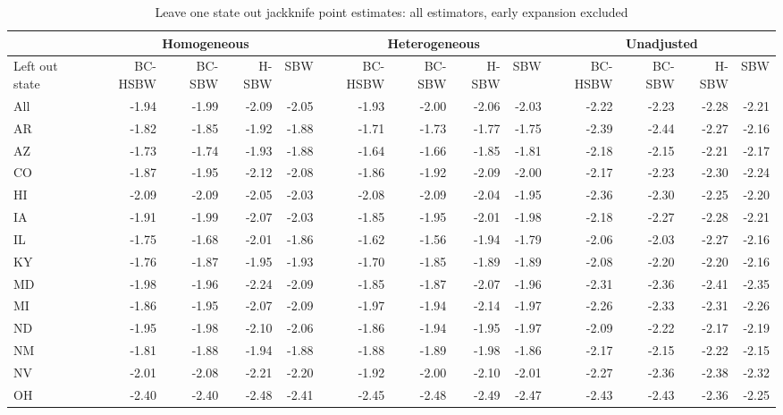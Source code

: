 \begin{landscape}
\begin{table}\caption{Leave one state out jackknife point estimates: all estimators, early expansion excluded}\label{tab:loojackknifec2}
\begin{tabular}{lrrrr|rrrr|rrrr}
\hline
 & \multicolumn{4}{c}{Homogeneous} & \multicolumn{4}{c}{Heterogeneous} & \multicolumn{4}{c}{Unadjusted} \\ 
 \hline
Left out state & BC-HSBW & BC-SBW & H-SBW & SBW & BC-HSBW & BC-SBW & H-SBW & SBW & BC-HSBW & BC-SBW & H-SBW & SBW \\ 
\hline
All & -1.94 & -1.99 & -2.09 & -2.05 & -1.93 & -2.00 & -2.06 & -2.03 & -2.22 & -2.23 & -2.28 & -2.21 \\ 
AR & -1.82 & -1.85 & -1.92 & -1.88 & -1.71 & -1.73 & -1.77 & -1.75 & -2.39 & -2.44 & -2.27 & -2.16 \\ 
AZ & -1.73 & -1.74 & -1.93 & -1.88 & -1.64 & -1.66 & -1.85 & -1.81 & -2.18 & -2.15 & -2.21 & -2.17 \\ 
CO & -1.87 & -1.95 & -2.12 & -2.08 & -1.86 & -1.92 & -2.09 & -2.00 & -2.17 & -2.23 & -2.30 & -2.24 \\ 
HI & -2.09 & -2.09 & -2.05 & -2.03 & -2.08 & -2.09 & -2.04 & -1.95 & -2.36 & -2.30 & -2.25 & -2.20 \\ 
IA & -1.91 & -1.99 & -2.07 & -2.03 & -1.85 & -1.95 & -2.01 & -1.98 & -2.18 & -2.27 & -2.28 & -2.21 \\ 
IL & -1.75 & -1.68 & -2.01 & -1.86 & -1.62 & -1.56 & -1.94 & -1.79 & -2.06 & -2.03 & -2.27 & -2.16 \\ 
KY & -1.76 & -1.87 & -1.95 & -1.93 & -1.70 & -1.85 & -1.89 & -1.89 & -2.08 & -2.20 & -2.20 & -2.16 \\ 
MD & -1.98 & -1.96 & -2.24 & -2.09 & -1.85 & -1.87 & -2.07 & -1.96 & -2.31 & -2.36 & -2.41 & -2.35 \\ 
MI & -1.86 & -1.95 & -2.07 & -2.09 & -1.97 & -1.94 & -2.14 & -1.97 & -2.26 & -2.33 & -2.31 & -2.26 \\ 
ND & -1.95 & -1.98 & -2.10 & -2.06 & -1.86 & -1.94 & -1.95 & -1.97 & -2.09 & -2.22 & -2.17 & -2.19 \\ 
NM & -1.81 & -1.88 & -1.94 & -1.88 & -1.88 & -1.89 & -1.98 & -1.86 & -2.17 & -2.15 & -2.22 & -2.15 \\ 
NV & -2.01 & -2.08 & -2.21 & -2.20 & -1.92 & -2.00 & -2.10 & -2.01 & -2.27 & -2.36 & -2.38 & -2.32 \\ 
OH & -2.40 & -2.40 & -2.48 & -2.41 & -2.45 & -2.48 & -2.49 & -2.47 & -2.43 & -2.43 & -2.36 & -2.25 \\ 

\end{tabular}
\end{table}
\end{landscape}
